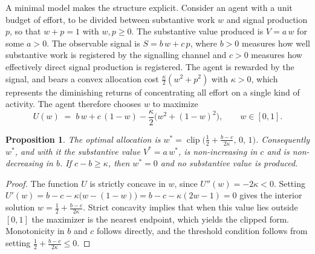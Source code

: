 \documentclass[11pt]{article}
\newtheorem{proposition}{Proposition}
\theoremstyle{definition}
\theoremstyle{remark}
\begin{document}
A minimal model makes the structure explicit. Consider an agent with a unit budget of effort, to be divided between substantive work $w$ and signal production $p$, so that $w + p = 1$ with $w, p \ge 0$. The substantive value produced is $V = a\,w$ for some $a > 0$. The observable signal is $S = b\,w + c\,p$, where $b > 0$ measures how well substantive work is registered by the signalling channel and $c > 0$ measures how effectively direct signal production is registered. The agent is rewarded by the signal, and bears a convex allocation cost $\tfrac{\kappa}{2}(w^2 + p^2)$ with $\kappa > 0$, which represents the diminishing returns of concentrating all effort on a single kind of activity. The agent therefore chooses $w$ to maximize
\[
U(w) \;=\; b\,w + c\,(1-w) - \frac{\kappa}{2}\bigl(w^2 + (1-w)^2\bigr), \qquad w \in [0,1].
\]

\begin{proposition}\label{prop:allocation}
The optimal allocation is $w^\ast = \operatorname{clip}\!\bigl(\tfrac12 + \tfrac{b-c}{2\kappa},\,0,\,1\bigr)$. Consequently $w^\ast$, and with it the substantive value $V^\ast = a\,w^\ast$, is non-increasing in $c$ and is non-decreasing in $b$. If $c - b \ge \kappa$, then $w^\ast = 0$ and no substantive value is produced.
\end{proposition}

\begin{proof}
The function $U$ is strictly concave in $w$, since $U''(w) = -2\kappa < 0$. Setting $U'(w) = b - c - \kappa\bigl(w - (1-w)\bigr) = b - c - \kappa(2w - 1) = 0$ gives the interior solution $w = \tfrac12 + \tfrac{b-c}{2\kappa}$. Strict concavity implies that when this value lies outside $[0,1]$ the maximizer is the nearest endpoint, which yields the clipped form. Monotonicity in $b$ and $c$ follows directly, and the threshold condition follows from setting $\tfrac12 + \tfrac{b-c}{2\kappa} \le 0$.
\end{proof}
\end{document}
